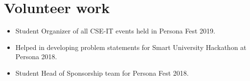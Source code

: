 \documentclass[letterpaper,11pt]{article}
\newcommand{\resumeItem}[2]{
  \item\small{
    \textbf{#1}{ #2 \vspace{-2pt}}
  }
}
\newcommand{\resumeSubItem}[2]{\resumeItem{#1}{#2}\vspace{-4pt}}
\newcommand{\resumeSubHeadingListStart}{\begin{itemize}[leftmargin=*]}
\newcommand{\resumeSubHeadingListEnd}{\end{itemize}}
\begin{document}
\section{Volunteer work}
  \resumeSubHeadingListStart
    \resumeSubItem{}{Student Organizer of all CSE-IT events held in Persona Fest 2019.}
    \resumeSubItem{}{Helped in developing problem statements for Smart University Hackathon at Persona 2018.}
    \resumeSubItem{}{Student Head of Sponsorship team for Persona Fest 2018.}
  \resumeSubHeadingListEnd



\end{document}
